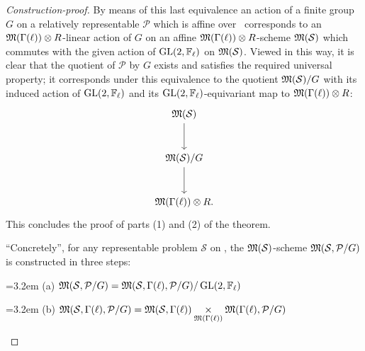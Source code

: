 \begin{proof}[Construction-proof]
By means of this last equivalence an action of a finite group $G$ on a relatively representable $\mathcal{P}$ which is affine over \EllR\ corresponds to an $\mathfrak{M}(\Gamma(\ell)) \otimes R$-linear action of $G$ on an affine $\mathfrak{M}(\Gamma(\ell)) \otimes R$-scheme $\mathfrak{M}(\mathcal{S})$ which commutes with the given action of $\operatorname{GL}(2,\mathbb{F}_\ell)$ on $\mathfrak{M}(\mathcal{S})$. Viewed in this way, it is clear that the quotient of $\mathcal{P}$ by $G$ exists and satisfies the required universal property; it corresponds under this equivalence to the quotient $\mathfrak{M}(\mathcal{S})/G$ with its induced action of $\operatorname{GL}(2,\mathbb{F}_\ell)$ and its $\operatorname{GL}(2,\mathbb{F}_\ell)$-equivariant map to $\mathfrak{M}(\Gamma(\ell)) \otimes R$:
\[
\begin{tikzcd}[column sep=large, row sep=large]
\Mfrak(\mathcal{S}) \arrow[d] \\
\Mfrak(\mathcal{S})/G \arrow[d] \\
\Mfrak(\Gamma(\ell)) \otimes R .
\end{tikzcd}
\]
This concludes the proof of parts (1) and (2) of the theorem.

``Concretely'', for any representable problem $\mathcal{S}$ on \EllR, the $\mathfrak{M}(\mathcal{S})$-scheme $\mathfrak{M}(\mathcal{S}, \mathcal{P}/G)$ is constructed in three steps:
\begin{kmindent}
\noindent\hangindent=3.2em (a) $\mathfrak{M}(\mathcal{S}, \mathcal{P}/G) = \mathfrak{M}(\mathcal{S}, \Gamma(\ell), \mathcal{P}/G)/\operatorname{GL}(2,\mathbb{F}_\ell)$

\noindent\hangindent=3.2em (b) $\mathfrak{M}(\mathcal{S}, \Gamma(\ell), \mathcal{P}/G) = \mathfrak{M}(\mathcal{S}, \Gamma(\ell)) \underset{\mathfrak{M}(\Gamma(\ell))}{\times} \mathfrak{M}(\Gamma(\ell), \mathcal{P}/G)$


\end{kmindent}
\end{proof}
